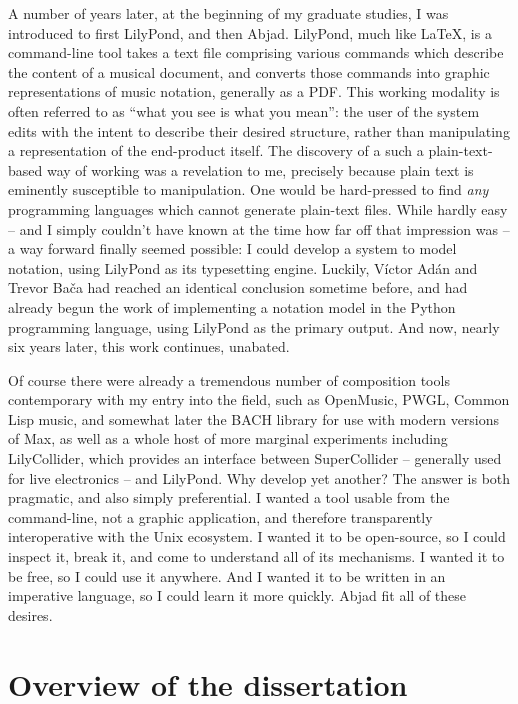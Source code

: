 A number of years later, at the beginning of my graduate studies, I was
introduced to first LilyPond, and then Abjad. LilyPond, much like \LaTeX{},
is a command-line tool takes a text file comprising various commands which
describe the content of a musical document, and converts those commands into
graphic representations of music notation, generally as a PDF. This working
modality is often referred to as \enquote{what you see is what you mean}: the
user of the system edits with the intent to describe their desired structure,
rather than manipulating a representation of the end-product itself. The
discovery of a such a plain-text-based way of working was a revelation to me,
precisely because plain text is eminently susceptible to manipulation. One
would be hard-pressed to find \emph{any} programming languages which cannot
generate plain-text files. While hardly easy -- and I simply couldn't have
known at the time how far off that impression was -- a way forward finally
seemed possible: I could develop a system to model notation, using LilyPond as
its typesetting engine. Luckily, V\'{i}ctor Ad\'{a}n and Trevor Ba\v{c}a had
reached an identical conclusion sometime before, and had already begun the work
of implementing a notation model in the Python programming language, using
LilyPond as the primary output. And now, nearly six years later, this work
continues, unabated.

Of course there were already a tremendous number of composition tools
contemporary with my entry into the field, such as OpenMusic, PWGL, Common Lisp
music, and somewhat later the BACH library for use with modern versions of Max,
as well as a whole host of more marginal experiments including LilyCollider,
which provides an interface between SuperCollider -- generally used for live
electronics -- and LilyPond. Why develop yet another? The answer is both
pragmatic, and also simply preferential. I wanted a tool usable from the
command-line, not a graphic application, and therefore transparently
interoperative with the Unix ecosystem. I wanted it to be open-source, so I
could inspect it, break it, and come to understand all of its mechanisms. I
wanted it to be free, so I could use it anywhere. And I wanted it to be written
in an imperative language, so I could learn it more quickly. Abjad fit all of
these desires.

\section{Overview of the dissertation}
\label{sec:overview-of-the-dissertation}

